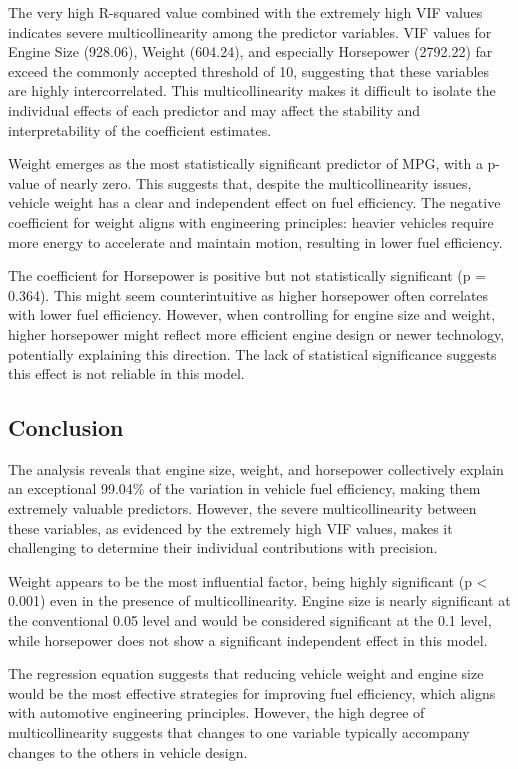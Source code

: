 \documentclass[12pt]{article}
\begin{document}
The very high R-squared value combined with the extremely high VIF values indicates severe multicollinearity among the predictor variables. VIF values for Engine Size (928.06), Weight (604.24), and especially Horsepower (2792.22) far exceed the commonly accepted threshold of 10, suggesting that these variables are highly intercorrelated. This multicollinearity makes it difficult to isolate the individual effects of each predictor and may affect the stability and interpretability of the coefficient estimates.

Weight emerges as the most statistically significant predictor of MPG, with a p-value of nearly zero. This suggests that, despite the multicollinearity issues, vehicle weight has a clear and independent effect on fuel efficiency. The negative coefficient for weight aligns with engineering principles: heavier vehicles require more energy to accelerate and maintain motion, resulting in lower fuel efficiency.

The coefficient for Horsepower is positive but not statistically significant (p = 0.364). This might seem counterintuitive as higher horsepower often correlates with lower fuel efficiency. However, when controlling for engine size and weight, higher horsepower might reflect more efficient engine design or newer technology, potentially explaining this direction. The lack of statistical significance suggests this effect is not reliable in this model.

\subsection{Conclusion}
The analysis reveals that engine size, weight, and horsepower collectively explain an exceptional 99.04\% of the variation in vehicle fuel efficiency, making them extremely valuable predictors. However, the severe multicollinearity between these variables, as evidenced by the extremely high VIF values, makes it challenging to determine their individual contributions with precision.

Weight appears to be the most influential factor, being highly significant (p < 0.001) even in the presence of multicollinearity. Engine size is nearly significant at the conventional 0.05 level and would be considered significant at the 0.1 level, while horsepower does not show a significant independent effect in this model.

The regression equation suggests that reducing vehicle weight and engine size would be the most effective strategies for improving fuel efficiency, which aligns with automotive engineering principles. However, the high degree of multicollinearity suggests that changes to one variable typically accompany changes to the others in vehicle design.
\end{document}
